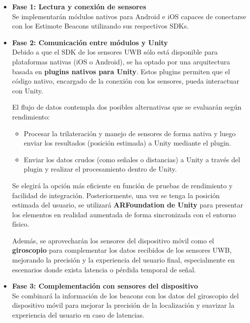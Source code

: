 \documentclass{article}
\begin{document}
\begin{itemize}
    \item \textbf{Fase 1: Lectura y conexión de sensores} \\
    Se implementarán módulos nativos para Android e iOS capaces de conectarse con los Estimote Beacons utilizando sus respectivos SDKs.

    \item \textbf{Fase 2: Comunicación entre módulos y Unity} \\
    Debido a que el SDK de los sensores UWB sólo está disponible para plataformas nativas (iOS o Android), se ha optado por una arquitectura basada en \textbf{plugins nativos para Unity}. Estos plugins permiten que el código nativo, encargado de la conexión con los sensores, pueda interactuar con Unity.

    El flujo de datos contempla dos posibles alternativas que se evaluarán según rendimiento:
    \begin{itemize}
        \item Procesar la trilateración y manejo de sensores de forma nativa y luego enviar los resultados (posición estimada) a Unity mediante el plugin.
        \item Enviar los datos crudos (como señales o distancias) a Unity a través del plugin y realizar el procesamiento dentro de Unity.
    \end{itemize}

    Se elegirá la opción más eficiente en función de pruebas de rendimiento y facilidad de integración. Posteriormente, una vez se tenga la posición estimada del usuario, se utilizará \textbf{ARFoundation de Unity} para presentar los elementos en realidad aumentada de forma sincronizada con el entorno físico.

    Además, se aprovecharán los sensores del dispositivo móvil como el \textbf{giroscopio} para complementar los datos recibidos de los sensores UWB, mejorando la precisión y la experiencia del usuario final, especialmente en escenarios donde exista latencia o pérdida temporal de señal.

    \item \textbf{Fase 3: Complementación con sensores del dispositivo} \\
    Se combinará la información de los beacons con los datos del giroscopio del dispositivo móvil para mejorar la precisión de la localización y suavizar la experiencia del usuario en caso de latencias.
\end{itemize}
\end{document}
